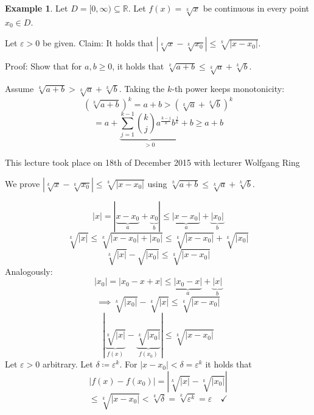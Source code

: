 \documentclass[a4paper,landscape,twocolumn]{article}
\theoremstyle{definition}
\newtheorem{ex}{Example}
\newcommand\abs[1]{\left|#1\right|}
\newcommand\meta[3]{\begin{mdframed}[skipbelow=4pt,skipabove=4pt,innermargin=1pt,innerleftmargin=1pt,innerrightmargin=1pt]\begin{center}\small{\textdownarrow{} This #1 took place on #2 with lecturer #3}\end{center}\end{mdframed}}
\begin{document}
\begin{ex}
  Let $D = [0, \infty) \subseteq \mathbb R$.
  Let $f(x) = \sqrt[k]{x}$ be continuous in every point $x_0 \in D$.

  Let $\varepsilon > 0$ be given.
  Claim: It holds that $\abs{\sqrt[k]{x} - \sqrt[k]{x_0}} \leq \sqrt[k]{\abs{x - x_0}}$.

  Proof: Show that for $a,b \geq 0$, it holds that
  $\sqrt[k]{a + b} \leq \sqrt[k]{a} + \sqrt[k]{b}$.

  Assume $\sqrt[k]{a + b} > \sqrt[k]{a} + \sqrt[k]{b}$.
  Taking the $k$-th power keeps monotonicity:
  \[ (\sqrt[k]{a + b})^k = a + b > \left(\sqrt[k]{a} + \sqrt[k]{b}\right)^k \]
  \[ = a + \underbrace{\sum_{j=1}^{k-1} {k \choose j} a^{\frac{k-j}{k}} b^{\frac{j}{k}}}_{>0} + b \geq a + b \]

  \meta{lecture}{18th of December 2015}{Wolfgang Ring}

  We prove $\abs{\sqrt[k]{x} - \sqrt[k]{x_0}} \leq \sqrt[k]{\abs{x - x_0}}$
  using $\sqrt[k]{a + b} \leq \sqrt[k]{a} + \sqrt[k]{b}$.

  \[
    \abs{x}
    = \abs{\underbrace{x - x_0}_{a} + \underbrace{x_0}_{b}}
    \leq \underbrace{\abs{x - x_0}}_{a} + \underbrace{\abs{x_0}}_{b}
  \] \[
    \sqrt[k]{\abs{x}}
    \leq \sqrt[k]{\abs{x - x_0} + \abs{x_0}}
    \leq \sqrt[k]{\abs{x - x_0}} + \sqrt[k]{\abs{x_0}}
  \] \[
    \sqrt[k]{\abs x} - \sqrt{\abs{x_0}} \leq \sqrt[k]{\abs{x - x_0}}
  \]
  Analogously:
  \[ \abs{x_0} = \abs{x_0 - x + x} \leq \underbrace{\abs{x_0 - x}}_{a} + \underbrace{\abs{x}}_{b} \]
  \[ \implies \sqrt[k]{\abs{x_0}} - \sqrt[k]{\abs x} \leq \sqrt[k]{\abs{x - x_0}} \]
  \[ \abs{\underbrace{\sqrt[k]{\abs x}}_{f(x)} - \underbrace{\sqrt[k]{\abs{x_0}}}_{f(x_0)}} \leq \sqrt[k]{\abs{x - x_0}} \]
  Let $\varepsilon > 0$ arbitrary. Let $\delta \coloneqq \varepsilon^k$.
  For $\abs{x - x_0} < \delta = \varepsilon^k$ it holds that
  \[ \abs{f(x) - f(x_0)} = \abs{\sqrt[k]{\abs x} - \sqrt[k]{\abs{x_0}}} \]
  \[ \leq \sqrt[k]{\abs{x - x_0}} < \sqrt[k]{\delta} = \sqrt[k]{\varepsilon^k} = \varepsilon \quad\checkmark \]
\end{ex}
\end{document}

